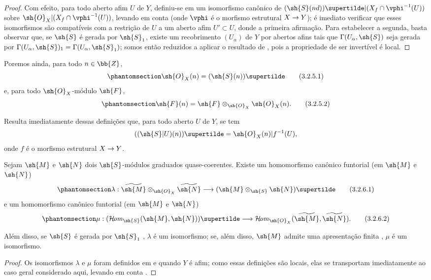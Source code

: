 \documentclass[oneside,10pt]{amsart}
\makeatletter
\newcommand{\ega@arrow}[2]{\mathchoice{#1}{#2}{#2}{#2}}
\renewcommand{\to}{\ega@arrow{\longrightarrow}{\rightarrow}}
\def\shHom{\mathcal{H}\!\mathit{om}}
\let\EGAOriginalLabel\label
\renewcommand{\label}[1]{\phantomsection\EGAOriginalLabel{#1}}
\makeatother
\begin{document}
\begin{proof}
Com efeito, para todo aberto afim $U$ de $Y$, definiu-se em  um isomorfismo canônico de $(\sh{S}(nd))\supertilde|(X_f\cap\vphi^{-1}(U))$ sobre $\sh{O}_X|(X_f\cap\vphi^{-1}(U))$, levando em conta  (onde $\vphi$ é o morfismo estrutural $X\to Y$);
é imediato verificar que esses isomorfismos são compatíveis com a restrição de $U$ a um aberto afim $U'\subset U$, donde a primeira afirmação.
Para estabelecer a segunda, basta observar que, se $\sh{S}$ é gerada por $\sh{S}_1$, existe um recobrimento $(U_\alpha)$ de $Y$ por abertos afins tais que $\Gamma(U_\alpha,\sh{S})$ seja gerada por $\Gamma(U_\alpha,\sh{S})_1=\Gamma(U_\alpha,\sh{S}_1)$;
somos então reduzidos a aplicar o resultado de , pois a propriedade de ser invertível é local.
\end{proof}

Poremos ainda, para todo $n\in\bb{Z}$,
\[
\label{II.3.2.5.1}
  \sh{O}_X(n)=(\sh{S}(n))\supertilde
\tag{3.2.5.1}
\]
e, para todo $\sh{O}_X$-módulo $\sh{F}$,
\[
\label{II.3.2.5.2}
  \sh{F}(n)=\sh{F}\otimes_{\sh{O}_X}\sh{O}_X(n).
\tag{3.2.5.2}
\]

Resulta imediatamente dessas definições que, para todo aberto $U$ de $Y$, se tem
\[
  ((\sh{S}|U)(n))\supertilde=\sh{O}_X(n)|f^{-1}(U),
\]
onde $f$ é o morfismo estrutural $X\to Y$.

\begin{proposition}[3.2.6]
\label{II.3.2.6}
Sejam $\sh{M}$ e $\sh{N}$ dois $\sh{S}$-módulos graduados quase-coerentes.
Existe um homomorfismo canônico funtorial (em $\sh{M}$ e $\sh{N}$)
\[
\label{II.3.2.6.1}
  \lambda:\widetilde{\sh{M}}\otimes_{\sh{O}_X}\widetilde{\sh{N}}\to(\sh{M}\otimes_{\sh{S}}\sh{N})\supertilde
\tag{3.2.6.1}
\]
e um homomorfismo canônico funtorial (em $\sh{M}$ e $\sh{N}$)
\[
\label{II.3.2.6.2}
  \mu:(\shHom_{\sh{S}}(\sh{M},\sh{N}))\supertilde\to\shHom_{\sh{O}_X}(\widetilde{\sh{M}},\widetilde{\sh{N}}).
\tag{3.2.6.2}
\]

Além disso, se $\sh{S}$ é gerada por $\sh{S}_1$ , $\lambda$ é um isomorfismo;
se, além disso, $\sh{M}$ admite uma apresentação finita , $\mu$ é um isomorfismo.
\end{proposition}

\begin{proof}
Os isomorfismos $\lambda$ e $\mu$ foram definidos em  e  quando $Y$ é afim;
como essas definições são locais, elas se transportam imediatamente ao caso geral considerado aqui, levando em conta .
\end{proof}
\end{document}
